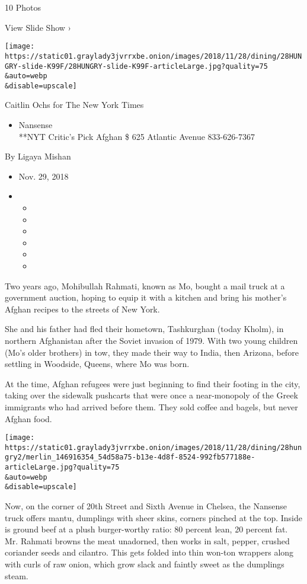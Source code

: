 10 Photos

View Slide Show ›

\texttt{[image: https://static01.graylady3jvrrxbe.onion/images/2018/11/28/dining/28HUNGRY-slide-K99F/28HUNGRY-slide-K99F-articleLarge.jpg?quality=75\\\&auto=webp\\\&disable=upscale]}

Caitlin Ochs for The New York Times

\begin{itemize}
\tightlist
\item
  Nansense\\
  **NYT Critic's Pick Afghan \$ 625 Atlantic Avenue 833-626-7367
\end{itemize}

By Ligaya Mishan

\begin{itemize}
\item
  Nov. 29, 2018
\item
  \begin{itemize}
  \item
  \item
  \item
  \item
  \item
  \item
  \end{itemize}
\end{itemize}

Two years ago, Mohibullah Rahmati, known as Mo, bought a mail truck at a
government auction, hoping to equip it with a kitchen and bring his
mother's Afghan recipes to the streets of New York.

She and his father had fled their hometown, Tashkurghan (today Kholm),
in northern Afghanistan after the Soviet invasion of 1979. With two
young children (Mo's older brothers) in tow, they made their way to
India, then Arizona, before settling in Woodside, Queens, where Mo was
born.

At the time, Afghan refugees were just beginning to find their footing
in the city, taking over the sidewalk pushcarts that were once a
near-monopoly of the Greek immigrants who had arrived before them. They
sold coffee and bagels, but never Afghan food.

\texttt{[image: https://static01.graylady3jvrrxbe.onion/images/2018/11/28/dining/28hungry2/merlin\_146916354\_54d58a75-b13e-4d8f-8524-992fb577188e-articleLarge.jpg?quality=75\\\&auto=webp\\\&disable=upscale]}

Now, on the corner of 20th Street and Sixth Avenue in Chelsea, the
Nansense truck offers mantu, dumplings with sheer skins, corners pinched
at the top. Inside is ground beef at a plush burger-worthy ratio: 80
percent lean, 20 percent fat. Mr. Rahmati browns the meat unadorned,
then works in salt, pepper, crushed coriander seeds and cilantro. This
gets folded into thin won-ton wrappers along with curls of raw onion,
which grow slack and faintly sweet as the dumplings steam.

